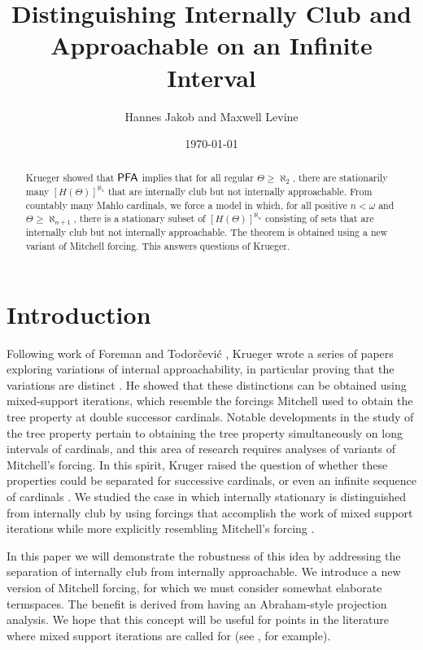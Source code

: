 \documentclass[a4paper]{amsart}
\title[Distinguishing Int. Club and Appr. on an Infinite Interval]{Distinguishing Internally Club and Approachable on an Infinite Interval} %
\author{Hannes Jakob and Maxwell Levine} %
\date{\today}
\theoremstyle{definition}
\theoremstyle{remark}
\theoremstyle{plain}
\numberwithin{mydef}{section}
\begin{document}
	
	
	\keywords{} %
	
	
	
	\begin{abstract} Krueger showed that $\textup{\textsf{PFA}}$ implies that for all regular $\Theta \ge \aleph_2$, there are stationarily many $[H(\Theta)]^{\aleph_1}$ that are internally club but not internally approachable. From countably many Mahlo cardinals, we force a model in which, for all positive $n<\omega$ and $\Theta \ge \aleph_{n+1}$, there is a stationary subset of $[H(\Theta)]^{\aleph_n}$ consisting of sets that are internally club but not internally approachable. The theorem is obtained using a new variant of Mitchell forcing. This answers questions of Krueger.
	\end{abstract}
	
	\maketitle
	
	\section{Introduction}
	




Following work of Foreman and Todor{\v c}evi{\' c} \cite{Foreman-Todorcevic2005}, Krueger wrote a series of papers exploring variations of internal approachability, in particular proving that the variations are distinct \cite{Krueger2007}. He showed that these distinctions can be obtained using mixed-support iterations, which resemble the forcings Mitchell used to obtain the tree property at double successor cardinals. Notable developments in the study of the tree property pertain to obtaining the tree property simultaneously on long intervals of cardinals, and this area of research requires analyses of variants of Mitchell's forcing. In this spirit, Kruger raised the question of whether these properties could be separated for successive cardinals, or even an infinite sequence of cardinals \cite{Krueger2009}. We studied the case in which internally stationary is distinguished from internally club by using forcings that accomplish the work of mixed support iterations while more explicitly resembling Mitchell's forcing \cite{Levine2023a,Jakob2023}.



In this paper we will demonstrate the robustness of this idea by addressing the separation of internally club from internally approachable. We introduce a new version of Mitchell forcing, for which we must consider somewhat elaborate termspaces. The benefit is derived from having an Abraham-style projection analysis. We hope that this concept will be useful for points in the literature where mixed support iterations are called for (see \cite{Fuchino-Rodrigues2018}, for example).
\end{document}
